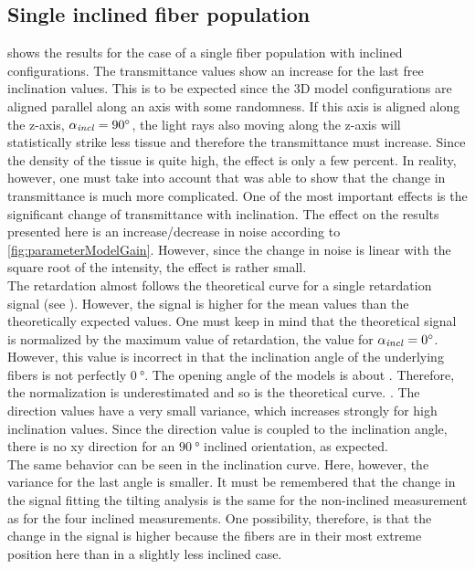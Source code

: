 \subsection{Single inclined fiber population}
 shows the results for the case of a single fiber population with inclined configurations.
The transmittance values show an increase for the last free inclination values.
This is to be expected since the 3D model configurations are aligned parallel along an axis with some randomness.
If this axis is aligned along the z-axis, \ie{} $\textnormal{$\alpha_{\mathit{incl}}$}=\SI{90}{\degree}$, the light rays also moving along the z-axis will statistically strike less tissue and therefore the transmittance must increase.
Since the density of the tissue is quite high, the effect is only a few percent.
In reality, however, one must take into account that \cite{Menzel2021} was able to show that the change in transmittance is much more complicated.
One of the most important effects is the significant change of transmittance with inclination.
The effect on the results presented here is an increase/decrease in noise according to \cref{fig:parameterModelGain}.
However, since the change in noise is linear with the square root of the intensity, the effect is rather small.
\\
%
The retardation almost follows the theoretical curve for a single retardation signal (see ).
However, the signal is higher for the mean values than the theoretically expected values.
One must keep in mind that the theoretical signal is normalized by the maximum value of retardation, \ie{} the value for $\textnormal{$\alpha_{\mathit{incl}}$} = \SI{0}{\degree}$.
However, this value is incorrect in that the inclination angle of the underlying fibers is not perfectly $\SI{0}{\degree}$. The opening angle of the models is about \dummy{}.
Therefore, the normalization is underestimated and so is the theoretical curve.
\dummy{}.
%
The direction values have a very small variance, which increases strongly for high inclination values.
Since the direction value is coupled to the inclination angle, there is no xy direction for an $\SI{90}{\degree}$ inclined orientation, as expected.
\\
%
The same behavior can be seen in the inclination curve.
Here, however, the variance for the last angle is smaller.
It must be remembered that the change in the signal fitting the tilting analysis is the same for the non-inclined measurement as for the four inclined measurements.
One possibility, therefore, is that the change in the signal is higher because the fibers are in their most extreme position here than in a slightly less inclined case.
